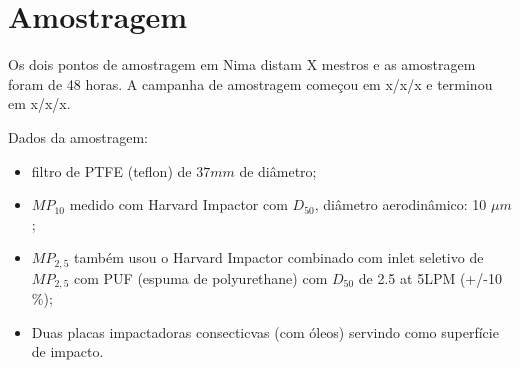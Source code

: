 \section{Amostragem}

Os dois pontos de amostragem em Nima distam X mestros e as amostragem foram de 48 horas.
A campanha de amostragem começou em x/x/x e terminou em x/x/x.

Dados da amostragem:%

\begin{itemize}
  \item filtro de PTFE (teflon) de $37mm$ de diâmetro;
  \item $MP_{10}$ medido com Harvard Impactor com $D_50$, diâmetro 
        aerodinâmico: 10 $\mu m$;
  \item $MP_{2,5}$ também usou o Harvard Impactor combinado com inlet 
         seletivo de $MP_{2,5}$ com PUF (espuma de polyurethane) com $D_50$ 
          de 2.5 at 5LPM (+/-10 \%);
  \item Duas placas impactadoras consecticvas (com óleos) servindo como 
        superfície de impacto.
\end{itemize}
